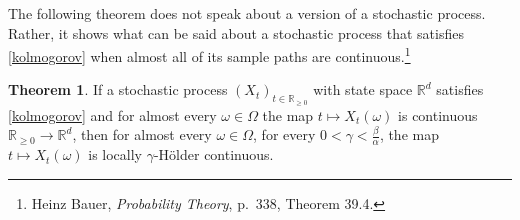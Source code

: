 \documentclass{article}
\theoremstyle{definition}
\newtheorem{theorem}{Theorem}
\theoremstyle{definition}
\begin{document}
The following theorem does not speak about a version of a stochastic process. Rather, it shows what can be said about a stochastic
process that satisfies \eqref{kolmogorov} when almost all of its sample paths are continuous.\footnote{Heinz Bauer, {\em Probability Theory}, p.~338, Theorem 39.4.}

\begin{theorem}
If a stochastic process $(X_t)_{t \in \mathbb{R}_{\geq 0}}$ with state space $\mathbb{R}^d$ satisfies \eqref{kolmogorov} and for almost every
$\omega \in \Omega$ the map $t \mapsto X_t(\omega)$ is continuous $\mathbb{R}_{\geq 0} \to \mathbb{R}^d$, then
for almost every $\omega \in \Omega$, 
for  every $0<\gamma<\frac{\beta}{\alpha}$,
the map $t \mapsto X_t(\omega)$ is  locally 
$\gamma$-H\"older continuous.
\label{holder}
\end{theorem}
\end{document}
